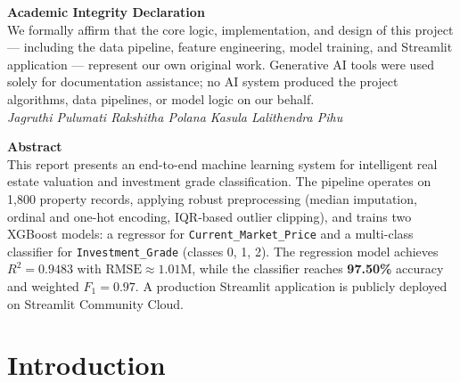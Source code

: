 \documentclass[12pt,a4paper]{article}
\begin{document}
\thispagestyle{empty}

\vspace*{1cm}
\begin{mdframed}[backgroundcolor=rowblue, linecolor=primaryblue, linewidth=1.2pt,
  innertopmargin=12pt, innerbottommargin=12pt]
\textbf{\large Academic Integrity Declaration}\\[8pt]
We formally affirm that the core logic, implementation, and design of this
project --- including the data pipeline, feature engineering, model training, and
Streamlit application --- represent our own original work. Generative AI tools were
used solely for documentation assistance; no AI system produced the project
algorithms, data pipelines, or model logic on our behalf.\\[8pt]
\textit{Jagruthi Pulumati \quad Rakshitha Polana \quad Kasula Lalithendra \quad Pihu}
\end{mdframed}

\vspace{1cm}

\begin{mdframed}[backgroundcolor=lightgray, linecolor=primaryblue, linewidth=1pt,
  innertopmargin=12pt, innerbottommargin=12pt]
\textbf{\large Abstract}\\[8pt]
This report presents an end-to-end machine learning system for intelligent real
estate valuation and investment grade classification. The pipeline operates on
1,800 property records, applying robust preprocessing (median imputation, ordinal
and one-hot encoding, IQR-based outlier clipping), and trains two XGBoost models:
a regressor for \texttt{Current\_Market\_Price} and a multi-class classifier for
\texttt{Investment\_Grade} (classes 0, 1, 2). The regression model achieves
$R^2 = \mathbf{0.9483}$ with $\text{RMSE} \approx 1.01\text{M}$, while the
classifier reaches \textbf{97.50\%} accuracy and weighted $F_1 = \mathbf{0.97}$.
A production Streamlit application is publicly deployed on Streamlit Community
Cloud.
\end{mdframed}

\newpage
\thispagestyle{empty}
\tableofcontents
\newpage

\section{Introduction}
\end{document}
